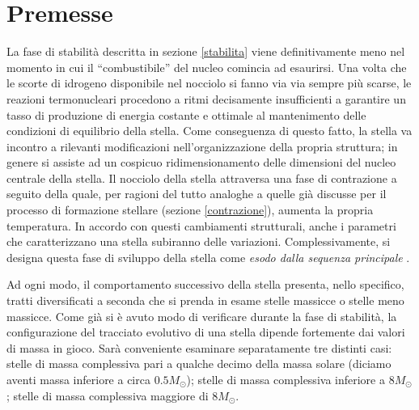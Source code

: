 

\label{esodo}
\minitoc\mtcskip

\section{Premesse}\label{Premesse}
La fase di stabilit\`{a} descritta in sezione \ref{stabilita} viene definitivamente meno nel momento in cui il ``combustibile'' del nucleo comincia ad esaurirsi.
Una volta che le scorte di idrogeno disponibile nel nocciolo si fanno via via sempre più scarse, le reazioni termonucleari procedono a ritmi decisamente insufficienti a garantire un tasso di produzione di energia costante e ottimale al mantenimento delle condizioni di equilibrio della stella.
Come conseguenza di questo fatto, la stella va incontro a rilevanti modificazioni  nell'organizzazione della propria struttura; in genere si assiste ad un cospicuo ridimensionamento delle dimensioni del nucleo centrale della stella.
Il nocciolo della stella attraversa una fase di contrazione a seguito della quale, per ragioni del tutto analoghe a quelle gi\`{a} discusse per il processo di formazione stellare (sezione \ref{contrazione}), aumenta la propria temperatura. 
In accordo con questi cambiamenti strutturali, anche i parametri che caratterizzano una stella subiranno delle variazioni. Complessivamente, si designa questa fase di sviluppo della stella come \emph{esodo dalla sequenza principale} \Cite{rosino}.
\par
Ad ogni modo, il comportamento successivo della stella presenta, nello specifico, tratti diversificati a seconda che si prenda in esame stelle massicce o stelle meno massicce.
Come gi\`{a} si è avuto modo di verificare durante la fase di stabilit\`{a}, la configurazione del tracciato evolutivo di una stella dipende fortemente dai valori di massa in gioco.
Sar\`{a} conveniente esaminare separatamente tre distinti casi: stelle di massa complessiva pari a qualche decimo della massa solare (diciamo aventi massa inferiore a circa $0.5 M_{\odot}$); stelle di massa complessiva inferiore a $8 M_{\odot}$; stelle di massa complessiva maggiore di $8 M_{\odot}$.
